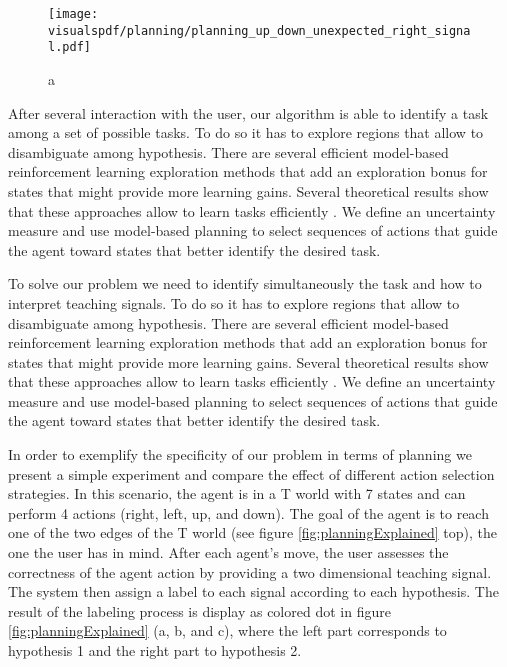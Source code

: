\begin{figure}[!ht]
  \centering
  \texttt{[image: \\visualspdf/planning/planning\_up\_down\_unexpected\_right\_signal.pdf]}
  \caption{a}
  \label{fig:uncertaintysmeaningupdownunexpectedright}
\end{figure}

After several interaction with the user, our algorithm is able to identify a task among a set of possible tasks. To do so it has to explore regions that allow to disambiguate among hypothesis. There are several efficient model-based reinforcement learning exploration methods that add an exploration bonus for states that might provide more learning gains. Several theoretical results show that these approaches allow to learn tasks efficiently \cite{brafman2003r,kolter2009near}. We define an uncertainty measure and use model-based planning to select sequences of actions that guide the agent toward states that better identify the desired task.

To solve our problem we need to identify simultaneously the task and how to interpret teaching signals. To do so it has to explore regions that allow to disambiguate among hypothesis. There are several efficient model-based reinforcement learning exploration methods that add an exploration bonus for states that might provide more learning gains. Several theoretical results show that these approaches allow to learn tasks efficiently \cite{brafman2003r,kolter2009near}. We define an uncertainty measure and use model-based planning to select sequences of actions that guide the agent toward states that better identify the desired task.

In order to exemplify the specificity of our problem in terms of planning we present a simple experiment and compare the effect of different action selection strategies. In this scenario, the agent is in a T world with 7 states and can perform 4 actions (right, left, up, and down). The goal of the agent is to reach one of the two edges of the T world (see figure \ref{fig:planningExplained} top), the one the user has in mind. After each agent's move, the user assesses the correctness of the agent action by providing a two dimensional teaching signal. The system then assign a label to each signal according to each hypothesis. The result of the labeling process is display as colored dot in figure \ref{fig:planningExplained} (a, b, and c), where the left part corresponds to hypothesis 1 and the right part to hypothesis 2.


